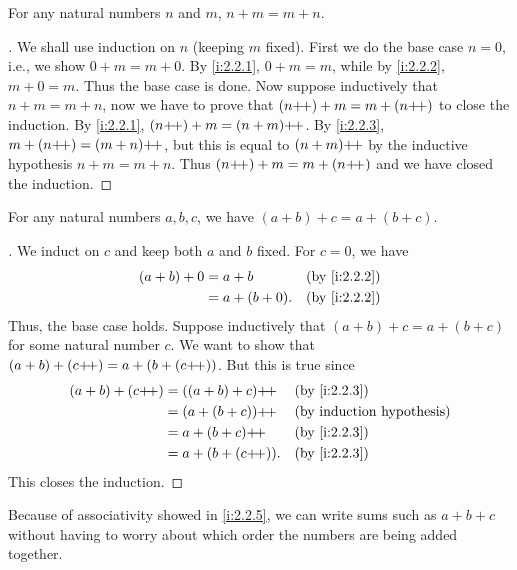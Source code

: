 \begin{prop}\label{i:2.2.4}
  For any natural numbers \(n\) and \(m\), \(n + m = m + n\).
\end{prop}

\begin{proof}[]
  We shall use induction on \(n\) (keeping \(m\) fixed).
  First we do the base case \(n = 0\), i.e., we show \(0 + m = m + 0\).
  By \cref{i:2.2.1}, \(0 + m = m\), while by \cref{i:2.2.2}, \(m + 0 = m\).
  Thus the base case is done.
  Now suppose inductively that \(n + m = m + n\), now we have to prove that \((n{+}\!{+}) + m = m + (n{+}\!{+})\) to close the induction.
  By \cref{i:2.2.1}, \((n{+}\!{+}) + m = (n + m){+}\!{+}\).
  By \cref{i:2.2.3}, \(m + (n{+}\!{+}) = (m + n){+}\!{+}\), but this is equal to \((n + m){+}\!{+}\) by the inductive hypothesis \(n+m=m+n\).
  Thus \((n{+}\!{+}) + m = m + (n{+}\!{+})\) and we have closed the induction.
\end{proof}

\begin{prop}\label{i:2.2.5}
  For any natural numbers \(a, b, c\), we have \((a + b) + c = a + (b + c)\).
\end{prop}

\begin{proof}[]
  We induct on \(c\) and keep both \(a\) and \(b\) fixed.
  For \(c = 0\), we have
  \begin{align*}
    (a + b) + 0 & = a + b        &  & \by{i:2.2.2} \\
                & = a + (b + 0). &  & \by{i:2.2.2}
  \end{align*}
  Thus, the base case holds.
  Suppose inductively that \((a + b) + c = a + (b + c)\) for some natural number \(c\).
  We want to show that \((a + b) + (c{+}\!{+}) = a + (b + (c{+}\!{+}))\).
  But this is true since
  \begin{align*}
    (a + b) + (c\pp) & = ((a + b) + c)\pp  &  & \by{i:2.2.3} \\
                     & = (a + (b + c))\pp  &  & \byIH        \\
                     & = a + (b + c)\pp    &  & \by{i:2.2.3} \\
                     & = a + (b + (c\pp)). &  & \by{i:2.2.3}
  \end{align*}
  This closes the induction.
\end{proof}

\begin{note}
  Because of associativity showed in \cref{i:2.2.5}, we can write sums such as \(a + b + c\) without having to worry about which order the numbers are being added together.
\end{note}

